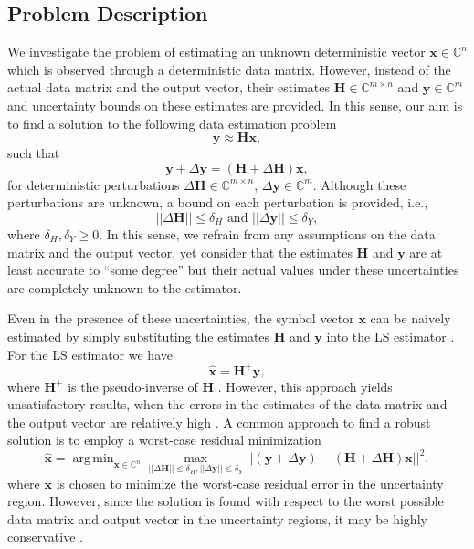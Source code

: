 \documentclass[review,sort&compress]{elsarticle}
\DeclareMathOperator*{\argmin}{arg\,min}
\renewcommand{\vec}[1]{\mbox{$\mathbf{#1}$}}
\newcommand{\norm}[1]{\left|\left|#1\right|\right|}
\newcommand{\C}{\mathbb{C}}
\newcommand{\vH}{\vec{H}}
\newcommand{\vx}{\vec{x}}
\newcommand{\vy}{\vec{y}}
\newcommand{\dH}{\Delta\vH}
\newcommand{\dy}{\Delta\vy}
\begin{document}
\subsection{Problem Description}
We investigate the problem of estimating an unknown deterministic vector $\vx \in \mathbb{C}^{n}$ which is observed through a deterministic data matrix. However, instead of the actual data matrix and the output vector, their estimates $\vH \in \C^{m\times n}$ and $\vy \in \C^m$ and uncertainty bounds on these estimates are provided. In this sense, our aim is to find a solution to the following data estimation problem
\[
\vy \approx \vH \vx,
\]
such that
\[
\vy+\dy = (\vH+\dH)\vx,
\]
for deterministic perturbations $\dH \in \C^{m \times n}$, $\dy \in \C^m$. Although these perturbations are unknown, a bound on each perturbation is provided, i.e.,
\[
\norm{\dH} \leq \delta_H \text{ and } \norm{\dy} \leq \delta_Y,
\]
where $\delta_H, \delta_Y \geq 0$. In this sense, we refrain from any assumptions on the data matrix and the output vector, yet consider that the estimates $\vH$ and $\vy$ are at least accurate to ``some degree'' but their actual values under these uncertainties are completely unknown to the estimator.

Even in the presence of these uncertainties, the symbol vector $\vx$ can be naively estimated by simply substituting the estimates $\vH$ and $\vy$ into the LS estimator \cite{sayedbook}. For the LS estimator we have
\[
\hat{\vx} = \vH^ + \vy,
\]
where $\vH^+$ is the pseudo-inverse of $\vH$ \cite{graham}. However, this approach yields unsatisfactory results, when the errors in the estimates of the data matrix and the output vector are relatively high \cite{est1, est2, yonina1, yonina2, yonina3}. A common approach to find a robust solution is to employ a worst-case residual minimization \cite{est1}
\[
\hat{\vx} = \argmin_{\vx \in \C^n} \max_{\norm{\dH} \leq \delta_H, \norm{\dy} \leq \delta_Y} {\norm{(\vy+\dy)-(\vH + \dH)\vx}}^2,
\]
where $\vx$ is chosen to minimize the worst-case residual error in the uncertainty region. However, since the solution is found with respect to the worst possible data matrix and output vector in the uncertainty regions, it may be highly conservative \cite{tls, yonina1, yonina3}.
\end{document}
